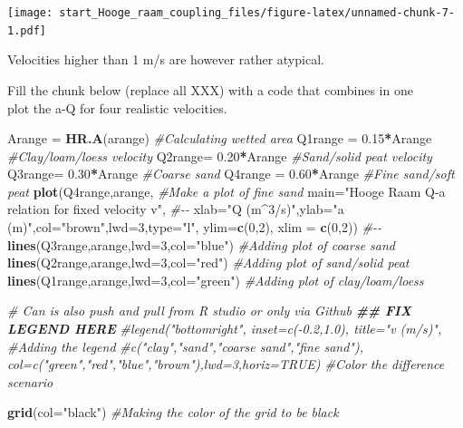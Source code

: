 \documentclass[
]{article}
\newenvironment{Shaded}{\begin{snugshade}}{\end{snugshade}}
\newcommand{\AttributeTok}[1]{\textcolor[rgb]{0.13,0.29,0.53}{#1}}
\newcommand{\CommentTok}[1]{\textcolor[rgb]{0.56,0.35,0.01}{\textit{#1}}}
\newcommand{\DecValTok}[1]{\textcolor[rgb]{0.00,0.00,0.81}{#1}}
\newcommand{\DocumentationTok}[1]{\textcolor[rgb]{0.56,0.35,0.01}{\textbf{\textit{#1}}}}
\newcommand{\FloatTok}[1]{\textcolor[rgb]{0.00,0.00,0.81}{#1}}
\newcommand{\FunctionTok}[1]{\textcolor[rgb]{0.13,0.29,0.53}{\textbf{#1}}}
\newcommand{\NormalTok}[1]{#1}
\newcommand{\OtherTok}[1]{\textcolor[rgb]{0.56,0.35,0.01}{#1}}
\newcommand{\SpecialCharTok}[1]{\textcolor[rgb]{0.81,0.36,0.00}{\textbf{#1}}}
\newcommand{\StringTok}[1]{\textcolor[rgb]{0.31,0.60,0.02}{#1}}
\begin{document}
\texttt{[image: start\_Hooge\_raam\_coupling\_files/figure-latex/unnamed-chunk-7-1.pdf]}

Velocities higher than 1 m/s are however rather atypical.

Fill the chunk below (replace all XXX) with a code that combines in
one\\
plot the a-Q for four realistic velocities.

\begin{Shaded}
\begin{Highlighting}[]
\NormalTok{Arange }\OtherTok{=}  \FunctionTok{HR.A}\NormalTok{(arange) }\CommentTok{\#Calculating wetted area}
\NormalTok{Q1range }\OtherTok{=} \FloatTok{0.15}\SpecialCharTok{*}\NormalTok{Arange  }\CommentTok{\#Clay/loam/loess velocity}
\NormalTok{Q2range}\OtherTok{=}  \FloatTok{0.20}\SpecialCharTok{*}\NormalTok{Arange   }\CommentTok{\#Sand/solid peat velocity}
\NormalTok{Q3range}\OtherTok{=}  \FloatTok{0.30}\SpecialCharTok{*}\NormalTok{Arange  }\CommentTok{\#Coarse sand }
\NormalTok{Q4range }\OtherTok{=} \FloatTok{0.60}\SpecialCharTok{*}\NormalTok{Arange     }\CommentTok{\#Fine sand/soft peat}
\FunctionTok{plot}\NormalTok{(Q4range,arange,   }\CommentTok{\#Make a plot of fine sand}
     \AttributeTok{main=}\StringTok{"Hooge Raam Q{-}a relation for fixed velocity v"}\NormalTok{, }\CommentTok{\#{-}{-}}
     \AttributeTok{xlab=}\StringTok{"Q (m\^{}3/s)"}\NormalTok{,}\AttributeTok{ylab=}\StringTok{"a (m)"}\NormalTok{,}\AttributeTok{col=}\StringTok{"brown"}\NormalTok{,}\AttributeTok{lwd=}\DecValTok{3}\NormalTok{,}\AttributeTok{type=}\StringTok{"l"}\NormalTok{, }\AttributeTok{ylim=}\FunctionTok{c}\NormalTok{(}\DecValTok{0}\NormalTok{,}\DecValTok{2}\NormalTok{), }\AttributeTok{xlim =} \FunctionTok{c}\NormalTok{(}\DecValTok{0}\NormalTok{,}\DecValTok{2}\NormalTok{)) }\CommentTok{\#{-}{-}}
\FunctionTok{lines}\NormalTok{(Q3range,arange,}\AttributeTok{lwd=}\DecValTok{3}\NormalTok{,}\AttributeTok{col=}\StringTok{"blue"}\NormalTok{) }\CommentTok{\#Adding plot of coarse sand}
\FunctionTok{lines}\NormalTok{(Q2range,arange,}\AttributeTok{lwd=}\DecValTok{3}\NormalTok{,}\AttributeTok{col=}\StringTok{"red"}\NormalTok{)  }\CommentTok{\#Adding plot of sand/solid peat}
\FunctionTok{lines}\NormalTok{(Q1range,arange,}\AttributeTok{lwd=}\DecValTok{3}\NormalTok{,}\AttributeTok{col=}\StringTok{"green"}\NormalTok{) }\CommentTok{\#Adding plot of clay/loam/loess}

\CommentTok{\# Can is also push and pull from R studio or only via Github}
\DocumentationTok{\#\# FIX LEGEND HERE}
\CommentTok{\#legend("bottomright", inset=c({-}0.2,1.0), title="v (m/s)", \#Adding the legend}
\CommentTok{\#c("clay","sand","coarse sand","fine sand"), col=c("green","red","blue","brown"),lwd=3,horiz=TRUE) \#Color the difference scenario}

\FunctionTok{grid}\NormalTok{(}\AttributeTok{col=}\StringTok{"black"}\NormalTok{) }\CommentTok{\#Making the color of the grid to be black}
\end{Highlighting}
\end{Shaded}
\end{document}
